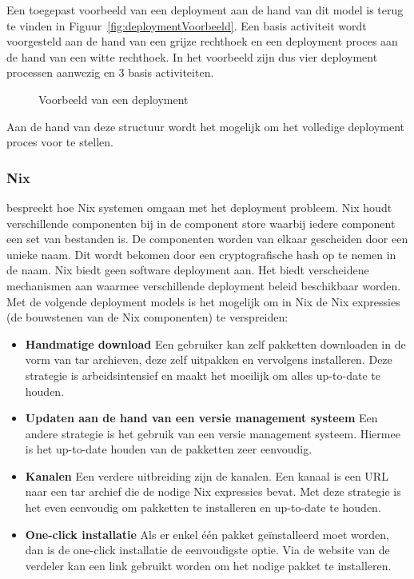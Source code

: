 Een toegepast voorbeeld van een deployment aan de hand van dit model is terug te vinden in Figuur~\vref{fig:deploymentVoorbeeld}.
Een basis activiteit wordt voorgesteld aan de hand van een grijze rechthoek en een deployment proces aan de hand van een witte rechthoek.
In het voorbeeld zijn dus vier deployment processen aanwezig en 3 basis activiteiten.

\begin{figure}[!ht]
\centering
{}
\caption{Voorbeeld van een deployment \citep{lestideau2003providing}}
\label{fig:deploymentVoorbeeld}
\end{figure}

Aan de hand van deze structuur wordt het mogelijk om het volledige deployment proces voor te stellen.

\subsubsection{Nix}
\citet{dolstra2006purely} bespreekt hoe Nix systemen omgaan met het deployment probleem.
Nix houdt verschillende componenten bij in de component store waarbij iedere component een set van bestanden is.
De componenten worden van elkaar gescheiden door een unieke naam.
Dit wordt bekomen door een cryptografische hash op te nemen in de naam.
Nix biedt geen software deployment aan.
Het biedt verscheidene mechanismen aan waarmee verschillende deployment beleid beschikbaar worden.
Met de volgende deployment models is het mogelijk om in Nix de Nix expressies (de bouwstenen van de Nix componenten) te verspreiden:
\begin{itemize}
\item \textbf{Handmatige download} Een gebruiker kan zelf pakketten downloaden in de vorm van tar archieven, deze zelf uitpakken en vervolgens installeren.
Deze strategie is arbeidsintensief en maakt het moeilijk om alles up-to-date te houden. 
\item \textbf{Updaten aan de hand van een versie management systeem} Een andere strategie is het gebruik van een versie management systeem.
Hiermee is het up-to-date houden van de pakketten zeer eenvoudig.
\item \textbf{Kanalen} Een verdere uitbreiding zijn de kanalen.
Een kanaal is een URL naar een tar archief die de nodige Nix expressies bevat.
Met deze strategie is het even eenvoudig om pakketten te installeren en up-to-date te houden.
\item \textbf{One-click installatie} Als er enkel één pakket geïnstalleerd moet worden, dan is de one-click installatie de eenvoudigste optie.
Via de website van de verdeler kan een link gebruikt worden om het nodige pakket te installeren.
\end{itemize}


